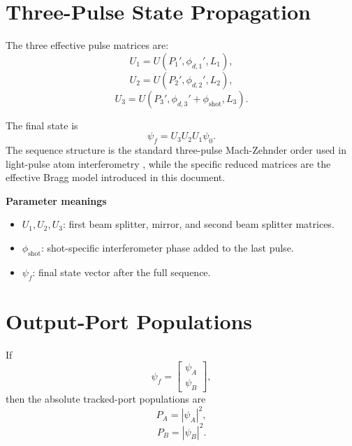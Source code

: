 \documentclass[11pt,a4paper]{article}
\begin{document}
\section{Three-Pulse State Propagation}

The three effective pulse matrices are:
\begin{equation}
  U_1 = U(P_1',\phi_{d,1}',L_1),
\end{equation}
\begin{equation}
  U_2 = U(P_2',\phi_{d,2}',L_2),
\end{equation}
\begin{equation}
  U_3 = U(P_3',\phi_{d,3}' + \phi_{\mathrm{shot}},L_3).
\end{equation}

The final state is
\begin{equation}
  \psi_f = U_3 U_2 U_1 \psi_0.
\end{equation}
The sequence structure is the standard three-pulse Mach-Zehnder order used in light-pulse atom interferometry \cite{Cheinet2008}, while the specific reduced matrices are the effective Bragg model introduced in this document.

\textbf{Parameter meanings}
\begin{itemize}[leftmargin=1.5em]
  \item $U_1, U_2, U_3$: first beam splitter, mirror, and second beam splitter matrices.
  \item $\phi_{\mathrm{shot}}$: shot-specific interferometer phase added to the last pulse.
  \item $\psi_f$: final state vector after the full sequence.
\end{itemize}

\section{Output-Port Populations}

If
\begin{equation}
  \psi_f =
  \begin{bmatrix}
    \psi_A \\
    \psi_B
  \end{bmatrix},
\end{equation}
then the absolute tracked-port populations are
\begin{equation}
  P_A = |\psi_A|^2,
\end{equation}
\begin{equation}
  P_B = |\psi_B|^2.
\end{equation}
\end{document}
